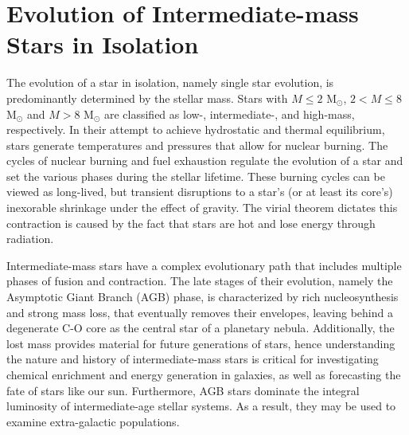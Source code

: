 \section{Evolution of Intermediate-mass Stars in Isolation}\label{sec:single_star_evolution}

The evolution of a star in isolation, namely single star evolution, is predominantly determined by the stellar mass. Stars with $M \leq 2$ M$_{\odot}$, $2 < M \leq 8$ M$_{\odot}$ and $M > 8$ M$_{\odot}$ are classified as low-, intermediate-, and high-mass, respectively. In their attempt to achieve hydrostatic and thermal equilibrium, stars generate temperatures and pressures that allow for nuclear burning. The cycles of nuclear burning and fuel exhaustion regulate the evolution of a star and set the various phases during the stellar lifetime. These burning cycles can be viewed as long-lived, but transient disruptions to a star's (or at least its core's) inexorable shrinkage under the effect of gravity. The virial theorem dictates this contraction is caused by the fact that stars are hot and lose energy through radiation. 

Intermediate-mass stars have a complex evolutionary path that includes multiple phases of fusion and contraction. The late stages of their evolution, namely the Asymptotic Giant Branch (AGB) phase, is characterized by rich nucleosynthesis and strong mass loss, that eventually removes their envelopes, leaving behind a degenerate C-O core as the central star of a planetary nebula\citep{pols2011stellar}. Additionally, the lost mass provides material for future generations of stars, hence understanding the nature and history of intermediate-mass stars is critical for investigating chemical enrichment and energy generation in galaxies, as well as forecasting the fate of stars like our sun. Furthermore, AGB stars dominate the integral luminosity of intermediate-age stellar systems. As a result, they may be used to examine extra-galactic populations\citep{marigo2007evolution}.

